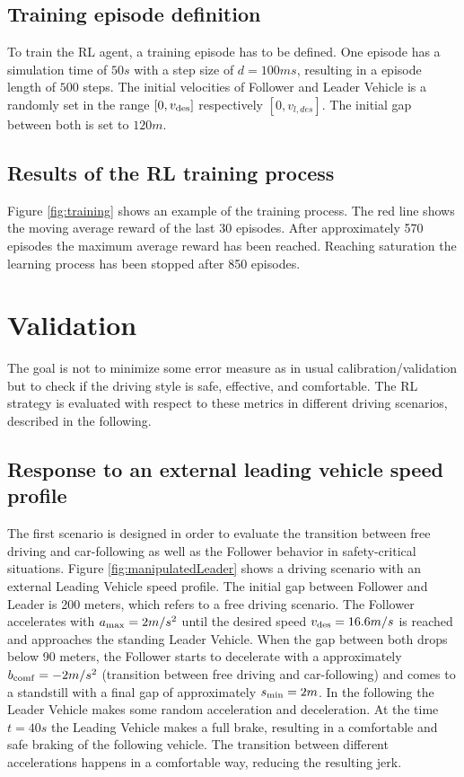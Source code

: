 \documentclass[review]{elsarticle}
\begin{document}
\subsection{Training episode definition}

To train the RL agent, a training episode has to be defined. One episode has a simulation time of $50s$ with a step size of $d=100ms$, resulting in a episode length of $500$ steps. The initial velocities of Follower and Leader Vehicle is a randomly set in the range $[0,v_{\rm des}]$ respectively  $[0,v_{l,des}]$. The initial gap between both is set to $120m$. 

\subsection{Results of the RL training process}

Figure \ref{fig:training} shows an example of the training process. The red line shows the moving average reward of the last 30 episodes. After approximately 570 episodes the maximum average reward has been reached. Reaching saturation the learning process has been stopped after 850 episodes. 

\section{Validation}

The goal is not to minimize some error measure as in usual
calibration/validation but to check if the driving style is safe,
effective, and comfortable. The RL strategy is evaluated with respect to these metrics in different driving scenarios, described in the following.

\subsection{Response to an external leading vehicle speed profile}
The first scenario is designed in order to evaluate the transition between free driving and car-following as well as the Follower behavior in safety-critical situations. 
Figure \ref{fig:manipulatedLeader} shows a driving scenario with an external Leading Vehicle speed profile. The initial gap between Follower and Leader is 200 meters, which refers to a free driving scenario. The Follower accelerates with $a_{\rm max} = 2m/s^2$ until the desired speed $v_{\rm des} = 16.6m/s$ is reached and approaches the standing Leader Vehicle. When the gap between both drops below 90 meters, the Follower starts to decelerate with a approximately $b_{\rm comf} = -2m/s^2$ (transition between free driving and car-following) and comes to a standstill with a final gap of approximately $s_{\rm min} = 2m$. In the following the Leader Vehicle makes some random acceleration and deceleration. At the time $t = 40s$ the Leading Vehicle makes a full brake, resulting in a comfortable and safe braking of the following vehicle. The transition between different accelerations happens in a comfortable way, reducing the resulting jerk. 
\end{document}
